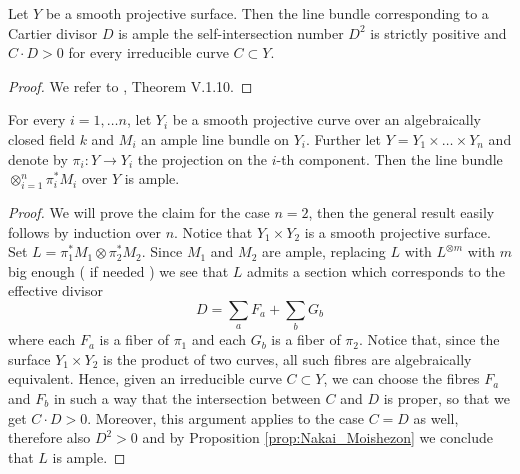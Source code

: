 	\begin{prop}\label{prop:Nakai_Moishezon}
		Let $Y$ be a smooth projective surface. Then the line bundle corresponding to a Cartier divisor $D$ is ample \ABiff the self-intersection number $D^2$ is strictly positive and $C\cdot D >0$ for every irreducible curve $C\subset Y$. 
	\end{prop}
	\begin{proof}
		We refer to \cite{HAG}, Theorem V.1.10.
	\end{proof}


	\begin{lemm}\label{lemm:tensor_ampleness}
		For every $i=1,\dots n$, let $Y_i$ be a smooth projective curve over an algebraically closed field $k$ and $M_i$ an ample line bundle on $Y_i$. Further let $Y=Y_1\times\dots\times Y_n$ and denote by $\pi_i:Y \to Y_i$ the projection on the $i$-th component. Then the line bundle
		$ \otimes_{i=1}^n \pi_i^* M_i $
		over $Y$ is ample.
	\end{lemm}
	\begin{proof}
		We will prove the claim for the case $n=2$, then the general result easily follows by induction over $n$. Notice that $Y_1 \times Y_2$ is a smooth projective surface. \\

		Set $L=\pi_1^*M_1 \otimes \pi_2^*M_2$. Since $M_1$ and $M_2$ are ample, replacing $L$ with $L^{\otimes m}$ with $m$ big enough ( if needed ) we see that $L$ admits a section which corresponds to the effective divisor
		$$ D = \sum_a F_a + \sum_b G_b $$
		where each $F_a$ is a fiber of $\pi_1$ and each $G_b$ is a fiber of $\pi_2$. Notice that, since the surface $Y_1 \times Y_2$ is the product of two curves, all such fibres are algebraically equivalent. Hence, given an irreducible curve $C\subset Y$, we can choose the fibres $F_a$ and $F_b$ in such a way that the intersection between $C$ and $D$ is proper, so that we get $C\cdot D > 0$. Moreover, this argument applies to the case $C=D$ as well, therefore also $D^2>0$ and by Proposition \ref{prop:Nakai_Moishezon} we conclude that $L$ is ample.
	\end{proof}	



